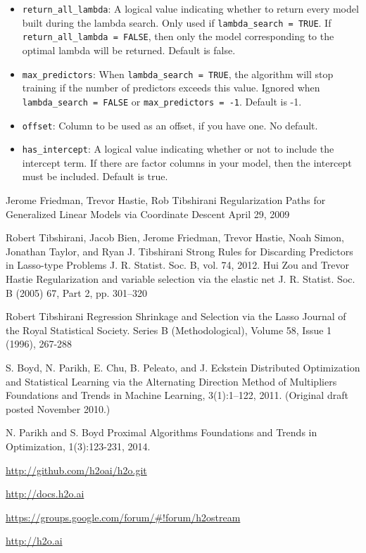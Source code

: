 \documentclass[11pt]{article}
\begin{document}
\begin{itemize}
\item \texttt{return\_all\_lambda}: A logical value indicating whether to return every model built during the lambda search. Only used if \texttt{lambda\_search = TRUE}. If \texttt{return\_all\_lambda = FALSE}, then only the model corresponding to the optimal lambda will be returned. Default is false.
\item \texttt{max\_predictors}: When \texttt{lambda\_search = TRUE}, the algorithm will stop training if the number of predictors exceeds this value. Ignored when \texttt{ lambda\_search = FALSE} or \texttt{max\_predictors = -1}. Default is -1.
\item \texttt{offset}: Column to be used as an offset, if you have one. No default.
\item \texttt{has\_intercept}: A logical value indicating whether or not to include the intercept term. If there are factor columns in your model, then the intercept must be included. Default is true.
\end{itemize}





\newpage

\begin{thebibliography}{9}

Jerome Friedman, Trevor Hastie, Rob Tibshirani
Regularization Paths for Generalized Linear Models via Coordinate Descent
April 29, 2009

  Robert Tibshirani, Jacob Bien, Jerome Friedman, Trevor Hastie, Noah Simon, Jonathan Taylor, and Ryan J. Tibshirani
  Strong Rules for Discarding Predictors in Lasso-type Problems
  J. R. Statist. Soc. B, vol. 74, 
  2012.
Hui Zou and Trevor Hastie
Regularization and variable selection via the elastic net
J. R. Statist. Soc. B (2005) 67, Part 2, pp. 301–320

Robert Tibshirani
Regression Shrinkage and Selection via the Lasso
Journal of the Royal Statistical Society. Series B (Methodological), Volume 58, Issue 1 (1996), 267-288

S. Boyd, N. Parikh, E. Chu, B. Peleato, and J. Eckstein
Distributed Optimization and Statistical Learning via the Alternating Direction Method of Multipliers
Foundations and Trends in Machine Learning, 3(1):1–122, 2011. (Original draft posted November 2010.)

N. Parikh and S. Boyd
Proximal Algorithms
Foundations and Trends in Optimization, 1(3):123-231, 2014.

\url{http://github.com/h2oai/h2o.git}

\url{http://docs.h2o.ai}

\url{https://groups.google.com/forum/#!forum/h2ostream}

\url{http://h2o.ai}

\end{thebibliography}

\end{document}
